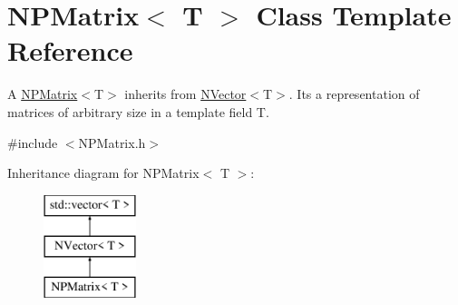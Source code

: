 \hypertarget{class_n_p_matrix}{}\section{N\+P\+Matrix$<$ T $>$ Class Template Reference}
\label{class_n_p_matrix}


A {\ttfamily \mbox{\hyperlink{class_n_p_matrix}{N\+P\+Matrix}}$<$T$>$} inherits from {\ttfamily \mbox{\hyperlink{class_n_vector}{N\+Vector}}$<$T$>$}. It\textquotesingle{}s a representation of matrices of arbitrary size in a template field {\ttfamily T}.  




{\ttfamily \#include $<$N\+P\+Matrix.\+h$>$}

Inheritance diagram for N\+P\+Matrix$<$ T $>$\+:\begin{figure}[H]
\begin{center}
\leavevmode
\includegraphics[height=3.000000cm]{class_n_p_matrix}
\end{center}
\end{figure}
